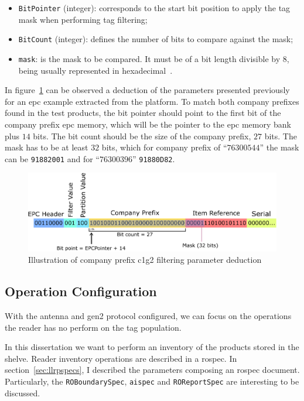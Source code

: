 \begin{itemize}
  \item \texttt{BitPointer} (integer): corresponds to the start bit position to apply the tag mask when performing tag filtering;
  \item \texttt{BitCount} (integer): defines the number of bits to compare against the mask;
  \item \texttt{mask}: is the mask to be compared. It must be of a bit length divisible by $8$, being usually represented in hexadecimal~\cite{LowLevelReader}.
\end{itemize}

In figure~\ref{fig:c1g2filter} can be observed a deduction of the parameters presented previously for an \ac{epc} example extracted from the platform.
To match both company prefixes found in the test products, the bit pointer should point to the first bit of the company prefix \ac{epc} memory, which will be the pointer to the \ac{epc} memory bank plus $14$ bits.
The bit count should be the size of the company prefix, $27$ bits. The mask has to be at least $32$ bits, which for company prefix of ``$76300544$'' the mask can be \texttt{91882001} and for ``$76300396$'' \texttt{91880D82}.

\begin{figure}
  \centering
  \includegraphics[width=\textwidth]{figs/c1g2filter.eps}
  \caption{Illustration of company prefix \ac{c1g2} filtering parameter deduction}
  \label{fig:c1g2filter}
\end{figure}

\subsection{Operation Configuration}

With the antenna and \ac{gen2} protocol configured, we can focus on the operations the reader has no perform on the tag population.

In this dissertation we want to perform an inventory of the products stored in the shelve. Reader inventory operations are described in a \ac{rospec}.
In section~\ref{sec:llrpspecs}, I described the parameters composing an \ac{rospec} document. Particularly, the \texttt{ROBoundarySpec}, \texttt{\acs{aispec}} and \texttt{ROReportSpec} are interesting to be discussed.

